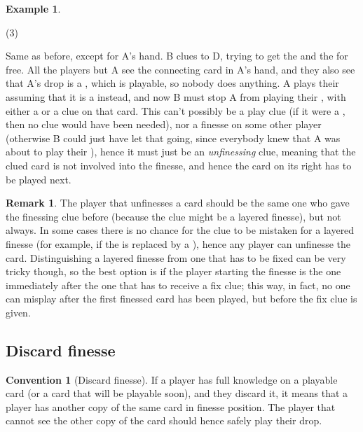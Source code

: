 \documentclass[a4paper]{article}
\theoremstyle{plain}
\theoremstyle{definition}
\newtheorem{remark}[theorem]{Remark}
\newtheorem{example}[theorem]{Example}
\newtheorem{convention}[theorem]{Convention}
\begin{document}
\begin{example}
	\hfill
	\begin{tasks}(3)
		\task[+]      
		\task[A]    
		\task[B]    
		\task[C]     
		\task[D]    
		\task[E]    
	\end{tasks}
	
	Same as before, except for A's hand. B clues  to D, trying to get the  and the  for free. All the players but A see the connecting card in A's hand, and they also see that A's drop is a , which is playable, so nobody does anything. A plays their  assuming that it is a  instead, and now B must stop A from playing their , with either a  or a  clue on that card. This can't possibly be a play clue (if it were a , then no clue would have been needed), nor a finesse on some other player (otherwise B could just have let that going, since everybody knew that A was about to play their ), hence it must just be an \textit{unfinessing} clue, meaning that the clued card is not involved into the finesse, and hence the card on its right has to be played next.
\end{example}

\begin{remark}
	The player that unfinesses a card should be the same one who gave the finessing clue before (because the clue might be a layered finesse), but not always. In some cases there is no chance for the clue to be mistaken for a layered finesse (for example, if the  is replaced by a ), hence any player can unfinesse the card. Distinguishing a layered finesse from one that has to be fixed can be very tricky though, so the best option is if the player starting the finesse is the one immediately after the one that has to receive a fix clue; this way, in fact, no one can misplay after the first finessed card has been played, but before the fix clue is given.
\end{remark}

\subsection{Discard finesse}

\begin{convention}[Discard finesse]
	If a player has full knowledge on a playable card (or a card that will be playable soon), and they discard it, it means that a player has another copy of the same card in finesse position. The player that cannot see the other copy of the card should hence safely play their drop.
\end{convention}
\end{document}

